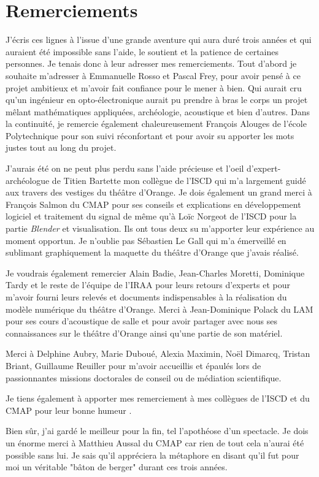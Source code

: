 \chapter*{Remerciements}

J'écris ces lignes à l'issue d'une grande aventure qui aura duré trois années et qui auraient été impossible sans l'aide, le soutient et la patience de certaines personnes. Je tenais donc à leur adresser mes remerciements. Tout d'abord je souhaite m'adresser à Emmanuelle Rosso et Pascal Frey, pour avoir pensé à ce projet ambitieux et m'avoir fait confiance pour le mener à bien. Qui aurait cru qu'un ingénieur en opto-électronique aurait pu prendre à bras le corps un projet mêlant mathématiques appliquées, archéologie, acoustique et bien d'autres. Dans la continuité, je remercie également chaleureusement François Alouges de l'école Polytechnique pour son suivi réconfortant et pour avoir su apporter les mots justes tout au long du projet. 

J'aurais été on ne peut plus perdu sans l'aide précieuse et l'oeil d'expert-archéologue de Titien Bartette mon collègue de l'ISCD qui m'a largement guidé aux travers des vestiges du théâtre d'Orange. Je dois également un grand merci à François Salmon du CMAP pour ses conseils et explications en développement logiciel et traitement du signal de même qu'à Loïc Norgeot de l'ISCD pour la partie \textit{Blender} et visualisation. Ils ont tous deux su m'apporter leur expérience au moment opportun. Je n'oublie pas Sébastien Le Gall qui m'a émerveillé en sublimant graphiquement la maquette du théâtre d'Orange que j'avais réalisé. 

Je voudrais également remercier Alain Badie, Jean-Charles Moretti, Dominique Tardy et le reste de l'équipe de l'IRAA pour leurs retours d'experts et pour m'avoir fourni leurs relevés et documents indispensables à la réalisation du modèle numérique du théâtre d'Orange. Merci à Jean-Dominique Polack du LAM pour ses cours d'acoustique de salle et pour avoir partager avec nous ses connaissances sur le théâtre d'Orange ainsi qu'une partie de son matériel.

Merci à Delphine Aubry, Marie Duboué, Alexia Maximin, Noël Dimarcq, Tristan Briant, Guillaume Reuiller pour m'avoir accueillis et épaulés lors de passionnantes missions doctorales de conseil ou de médiation scientifique.

Je tiens également à apporter mes remerciement à mes collègues de l'ISCD et du CMAP pour leur bonne humeur .

Bien sûr, j'ai gardé le meilleur pour la fin, tel l'apothéose d'un spectacle. Je dois un énorme merci à Matthieu Aussal du CMAP car rien de tout cela n'aurai été possible sans lui. Je sais qu'il appréciera la métaphore en disant qu'il fut pour moi un véritable "bâton de berger" durant ces trois années.

